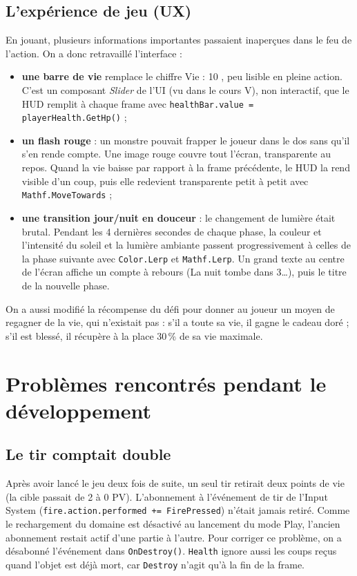 \documentclass[11pt,a4paper]{article}
\begin{document}
\subsection{L'expérience de jeu (UX)}
En jouant, plusieurs informations importantes passaient inaperçues dans le feu de l'action. On a donc retravaillé l'interface :
\begin{itemize}
  \item \textbf{une barre de vie} remplace le chiffre \og Vie : 10 \fg{}, peu lisible en pleine action. C'est un composant \emph{Slider} de l'UI (vu dans le cours V), non interactif, que le HUD remplit à chaque frame avec \texttt{healthBar.value = playerHealth.GetHp()} ;
  \item \textbf{un flash rouge} : un monstre pouvait frapper le joueur dans le dos sans qu'il s'en rende compte. Une image rouge couvre tout l'écran, transparente au repos. Quand la vie baisse par rapport à la frame précédente, le HUD la rend visible d'un coup, puis elle redevient transparente petit à petit avec \texttt{Mathf.MoveTowards} ;
  \item \textbf{une transition jour/nuit en douceur} : le changement de lumière était brutal. Pendant les 4 dernières secondes de chaque phase, la couleur et l'intensité du soleil et la lumière ambiante passent progressivement à celles de la phase suivante avec \texttt{Color.Lerp} et \texttt{Mathf.Lerp}. Un grand texte au centre de l'écran affiche un compte à rebours (\og La nuit tombe dans 3\ldots \fg{}), puis le titre de la nouvelle phase.
\end{itemize}
On a aussi modifié la récompense du défi pour donner au joueur un moyen de regagner de la vie, qui n'existait pas : s'il a toute sa vie, il gagne le cadeau doré ; s'il est blessé, il récupère à la place 30\,\% de sa vie maximale.

\section{Problèmes rencontrés pendant le développement}

\subsection{Le tir comptait double}
Après avoir lancé le jeu deux fois de suite, un seul tir retirait deux points de vie (la cible passait de 2 à 0 PV). L'abonnement à l'événement de tir de l'Input System (\texttt{fire.action.performed += FirePressed}) n'était jamais retiré. Comme le rechargement du domaine est désactivé au lancement du mode Play, l'ancien abonnement restait actif d'une partie à l'autre. Pour corriger ce problème, on a désabonné l'événement dans \texttt{OnDestroy()}. \texttt{Health} ignore aussi les coups reçus quand l'objet est déjà mort, car \texttt{Destroy} n'agit qu'à la fin de la frame.
\end{document}
